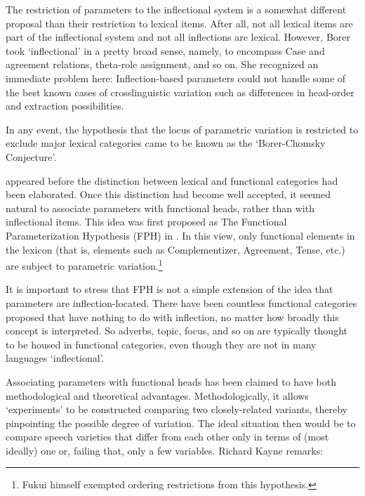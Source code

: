 \documentclass[output=paper,
modfonts
]{LSP/langsci}
\begin{document}
The restriction of parameters to the inflectional system is a somewhat
different proposal than their restriction to lexical items. After all,
not all lexical items are part of the inflectional system and not all
inflections are lexical. However, Borer took `inflectional' in a pretty
broad sense, namely, to encompass Case and agreement relations,
theta-role assignment, and so on. She recognized an immediate problem
here: Inflection-based parameters could not handle some of the best
known cases of crosslinguistic variation such as differences in
head-order and extraction possibilities.

In any event, the hypothesis that the locus of parametric variation is
restricted to exclude major lexical categories came to be known as the
`Borer-Chomsky Conjecture'.

\citet{borer1984} appeared before the distinction between lexical and
functional categories had been elaborated. Once this distinction had
become well accepted, it seemed natural to associate parameters with
functional heads, rather than with inflectional items. This idea was
first proposed as The Functional Parameterization Hypothesis (FPH) in
\citet{fukui1988}. In this view, only functional elements in the lexicon
(that is, elements such as Complementizer, Agreement, Tense, etc.) are
subject to parametric variation.\footnote{Fukui himself exempted
  ordering restrictions from this hypothesis.}

It is important to stress that FPH is not a simple extension of the idea
that parameters are inflection-located. There have been countless
functional categories proposed that have nothing to do with inflection,
no matter how broadly this concept is interpreted. So adverbs, topic,
focus, and so on are typically thought to be housed in functional
categories, even though they are not in many languages `inflectional'.

Associating parameters with functional heads has been claimed to have
both methodological and theoretical advantages. Methodologically, it
allows `experiments' to be constructed comparing two closely-related
variants, thereby pinpointing the possible degree of variation. The
ideal situation then would be to compare speech varieties that differ
from each other only in terms of (most ideally) one or, failing that,
only a few variables. Richard Kayne remarks:
\end{document}
